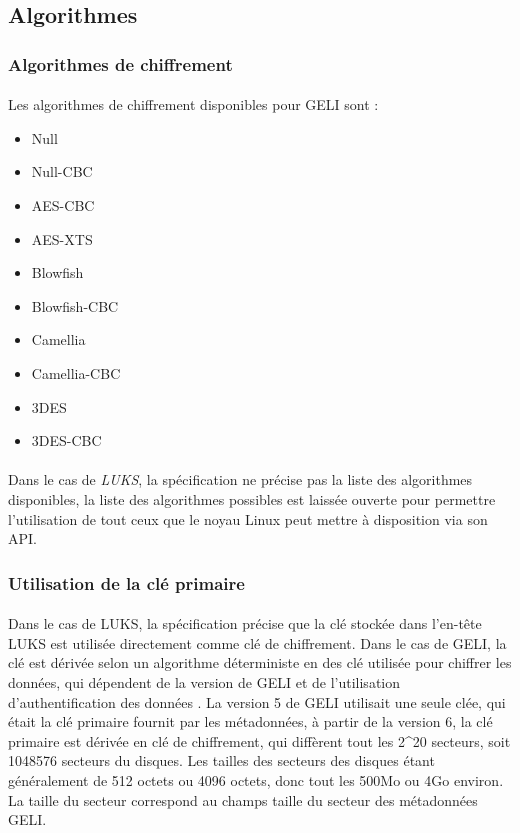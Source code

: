 \subsection{Algorithmes}
\subsubsection{Algorithmes de chiffrement}
\paragraph{}
Les algorithmes de chiffrement disponibles pour GELI \cite{geli.h} sont :
\begin{itemize}
	\item Null
	\item Null-CBC
	\item AES-CBC
	\item AES-XTS
	\item Blowfish
	\item Blowfish-CBC
	\item Camellia
	\item Camellia-CBC
	\item 3DES
	\item 3DES-CBC
\end{itemize}

\paragraph{}
Dans le cas de {\em LUKS}, la spécification \cite{onDiskFormatLuks}
ne précise pas la liste des algorithmes disponibles, la liste des algorithmes 
possibles est laissée ouverte pour permettre l'utilisation de tout ceux que le 
noyau Linux peut mettre à disposition via son API.

\subsubsection{Utilisation de la clé primaire}
\paragraph{}
Dans le cas de LUKS, la spécification \cite{onDiskFormatLuks} précise que la 
clé stockée dans l'en-tête LUKS est utilisée directement comme clé de 
chiffrement. Dans le cas de GELI, la clé est dérivée selon un algorithme 
déterministe en des clé utilisée pour chiffrer les données, qui dépendent de 
la version de GELI et de l'utilisation d'authentification des données 
\cite{manGeli}. La version 5 de GELI utilisait une seule clée, qui était la clé
primaire fournit par les métadonnées, à partir de la version 6, la clé primaire
est dérivée en clé de chiffrement, qui diffèrent tout les 2\textasciicircum20 
secteurs, soit 1048576 secteurs du disques. Les tailles des secteurs des 
disques étant généralement de 512 octets ou 4096 octets, 
donc tout les 500Mo ou 4Go environ.
La taille du secteur correspond au champs taille du secteur des métadonnées
GELI.

